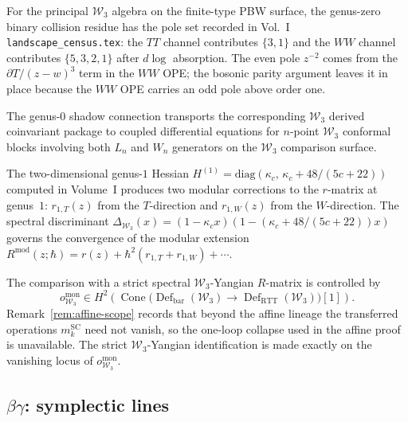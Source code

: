 \begin{remark}
\label{comp:line-op-w3}
For the principal $\mathcal W_3$ algebra on the finite-type PBW
surface, the genus-zero binary collision residue has the pole set
recorded in Vol.~I \texttt{landscape\_census.tex}: the $TT$ channel
contributes $\{3,1\}$ and the $WW$ channel contributes $\{5,3,2,1\}$
after $d\log$ absorption. The even pole $z^{-2}$ comes from the
$\partial T/(z-w)^3$ term in the $WW$ OPE; the bosonic parity
argument leaves it in place because the $WW$ OPE carries an odd pole
above order one.

The genus-$0$ shadow connection transports the corresponding
$\mathcal W_3$ derived coinvariant package to coupled differential
equations for $n$-point $\mathcal W_3$ conformal blocks involving both
$L_n$ and $W_n$ generators on the $\mathcal W_3$ comparison surface.

The two-dimensional genus-$1$ Hessian
$H^{(1)}=\mathrm{diag}(\kappa_c,\,\kappa_c+48/(5c+22))$
computed in Volume~I
produces two modular corrections to the $r$-matrix at
genus~$1$: $r_{1,T}(z)$ from the $T$-direction and
$r_{1,W}(z)$ from the $W$-direction. The spectral
discriminant $\Delta_{\mathcal W_3}(x)=
(1-\kappa_c x)(1-(\kappa_c+48/(5c+22))x)$
governs the convergence of the modular extension
$R^{\mathrm{mod}}(z;\hbar)
=r(z)+\hbar^2(r_{1,T}+r_{1,W})+\cdots$.

The comparison with a strict spectral $\mathcal W_3$-Yangian
$R$-matrix is controlled by
\[
 o_{\mathcal W_3}^{\mathrm{mon}}\in
 H^2\!\left(
 \operatorname{Cone}\bigl(
 \operatorname{Def}_{\mathrm{bar}}(\mathcal W_3)
 \longrightarrow
 \operatorname{Def}_{\mathrm{RTT}}(\mathcal W_3)
 \bigr)[1]\right).
\]
Remark~\ref{rem:affine-scope} records that beyond the affine lineage
the transferred operations $m_k^{\mathrm{SC}}$ need not vanish, so the
one-loop collapse used in the affine proof is unavailable. The strict
$\mathcal W_3$-Yangian identification is made exactly on the
vanishing locus of $o_{\mathcal W_3}^{\mathrm{mon}}$.
\end{remark}

\subsection{$\beta\gamma$: symplectic lines}
\label{subsec:line-op-betagamma}

